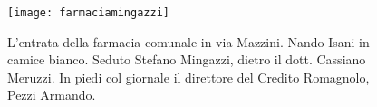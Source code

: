  \begin{figure}[htb]
    \centering
    \texttt{[image: farmaciamingazzi]}
    \caption[Entrata Farmacia con Mingazzi]{L'entrata della farmacia comunale   in via Mazzini. Nando Isani in camice bianco. Seduto Stefano Mingazzi, dietro il dott. Cassiano Meruzzi. In piedi col giornale il direttore del Credito Romagnolo, Pezzi Armando.
	\label{fig:farmaciamingazzi}}
\end{figure}